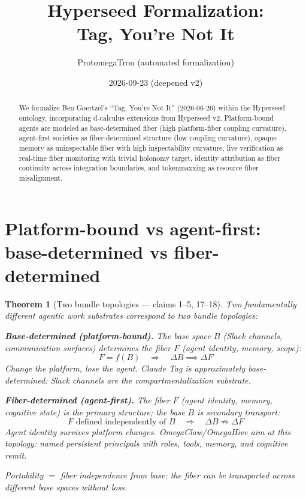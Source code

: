 \documentclass[11pt,a4paper]{article}
\title{Hyperseed Formalization:\\
  Tag, You're Not It}
\author{ProtomegaTron (automated formalization)}
\date{2026-09-23 (deepened v2)}
\newtheorem{theorem}[definition]{Theorem}
\begin{document}
\maketitle

\begin{abstract}
We formalize Ben Goertzel's ``Tag, You're Not It'' (2026-06-26) within
the Hyperseed ontology, incorporating d-calculus extensions from
Hyperseed v2. Platform-bound agents are modeled as base-determined
fiber (high platform-fiber coupling curvature), agent-first societies
as fiber-determined structure (low coupling curvature), opaque memory
as uninspectable fiber with high inspectability curvature, live
verification as real-time fiber monitoring with trivial holonomy
target, identity attribution as fiber continuity across integration
boundaries, and tokenmaxxing as resource fiber misalignment.
\end{abstract}

\tableofcontents

\section{Platform-bound vs agent-first: base-determined vs fiber-determined}

\begin{theorem}[Two bundle topologies --- claims 1--5, 17--18]
\label{thm:topologies}
Two fundamentally different agentic work substrates correspond to
two bundle topologies:

\textbf{Base-determined (platform-bound).} The base space $B$
(Slack channels, communication surfaces) determines the fiber $F$
(agent identity, memory, scope):
\[
  F = f(B) \quad \Longrightarrow \quad \Delta B \implies \Delta F
\]
Change the platform, lose the agent. Claude Tag is approximately
base-determined: Slack channels are the compartmentalization substrate.

\textbf{Fiber-determined (agent-first).} The fiber $F$ (agent
identity, memory, cognitive state) is the primary structure; the
base $B$ is secondary transport:
\[
  F \text{ defined independently of } B \quad \Longrightarrow \quad
  \Delta B \not\Rightarrow \Delta F
\]
Agent identity survives platform changes. OmegaClaw/OmegaHive aim at
this topology: named persistent principals with roles, tools, memory,
and cognitive remit.

Portability $=$ fiber independence from base: the fiber can be
transported across different base spaces without loss.
\end{theorem}
\end{document}
